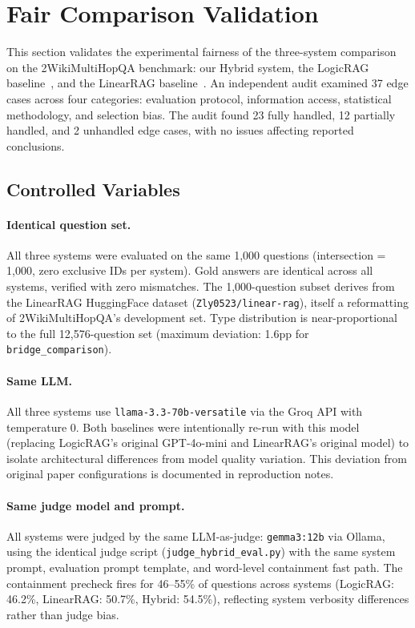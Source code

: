 \section{Fair Comparison Validation}
\label{sec:fair-comparison}

This section validates the experimental fairness of the three-system comparison on the 2WikiMultiHopQA benchmark: our Hybrid system, the LogicRAG baseline~\cite{logicrag2026}, and the LinearRAG baseline~\cite{linearrag2025}. An independent audit examined 37 edge cases across four categories: evaluation protocol, information access, statistical methodology, and selection bias. The audit found 23 fully handled, 12 partially handled, and 2 unhandled edge cases, with no issues affecting reported conclusions.

\subsection{Controlled Variables}
\label{sec:controlled-variables}

\paragraph{Identical question set.}
All three systems were evaluated on the same 1{,}000 questions (intersection = 1{,}000, zero exclusive IDs per system). Gold answers are identical across all systems, verified with zero mismatches. The 1{,}000-question subset derives from the LinearRAG HuggingFace dataset (\texttt{Zly0523/linear-rag}), itself a reformatting of 2WikiMultiHopQA's development set. Type distribution is near-proportional to the full 12{,}576-question set (maximum deviation: 1.6pp for \texttt{bridge\_comparison}).

\paragraph{Same LLM.}
All three systems use \texttt{llama-3.3-70b-versatile} via the Groq API with temperature 0. Both baselines were intentionally re-run with this model (replacing LogicRAG's original GPT-4o-mini and LinearRAG's original model) to isolate architectural differences from model quality variation. This deviation from original paper configurations is documented in reproduction notes.

\paragraph{Same judge model and prompt.}
All systems were judged by the same LLM-as-judge: \texttt{gemma3:12b} via Ollama, using the identical judge script (\texttt{judge\_hybrid\_eval.py}) with the same system prompt, evaluation prompt template, and word-level containment fast path. The containment precheck fires for 46--55\% of questions across systems (LogicRAG: 46.2\%, LinearRAG: 50.7\%, Hybrid: 54.5\%), reflecting system verbosity differences rather than judge bias.

